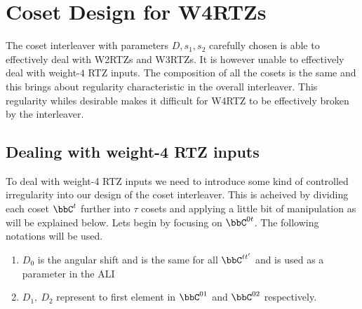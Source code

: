 \section{Coset Design for W4RTZs}
The coset interleaver with parameters $D,s_1,s_2$ carefully chosen is able to effectively deal with W2RTZs and W3RTZs. It is however unable to effectively deal with weight-$4$ RTZ inputs. The composition of all the cosets is the same and this brings about regularity characteristic in the overall interleaver. This regularity whiles desirable makes it difficult for W4RTZ to be effectively broken by the interleaver. 



\subsection{Dealing with weight-4 RTZ inputs}
To deal with weight-4 RTZ inputs we need to introduce some kind of controlled irregularity into our design of the coset interleaver. This is acheived by dividing each coset $\bbC^t$ further into $\tau $ cosets and applying a little bit of manipulation as will be explained below. Lets begin by focusing on $\bbC^{0t}$. The following notations will be used.

\begin{enumerate}

\item $D_0$ is the angular shift and is the same for all $\bbC^{tt'}$ and is used as a parameter in the ALI

\item $D_1,~D_2$ represent to first element in $\bbC^{01}$ and $\bbC^{02}$ respectively.

\end{enumerate}

